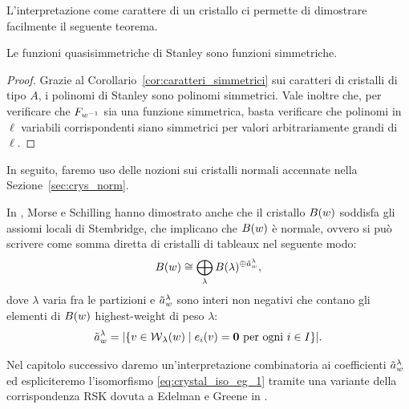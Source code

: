 L'interpretazione come carattere di un cristallo ci permette di dimostrare facilmente
il seguente teorema.

\begin{theorem}
    Le funzioni quasisimmetriche di Stanley sono funzioni simmetriche.
\end{theorem}

\begin{proof}
    Grazie al Corollario~\ref{cor:caratteri_simmetrici} sui caratteri di cristalli
    di tipo $A$, i polinomi di Stanley sono polinomi simmetrici.
    Vale inoltre che, per verificare che $F_{w^{-1}}$ sia una funzione
    simmetrica, basta verificare che polinomi in $\ell$ variabili corrispondenti
    siano simmetrici per valori arbitrariamente grandi di $\ell$.
\end{proof}

In seguito, faremo uso delle nozioni sui cristalli normali
accennate nella Sezione~\ref{sec:crys_norm}.

In \cite[Appendix~A]{morse-schilling-15}, Morse e Schilling hanno dimostrato anche che 
il cristallo $B(w)$ soddisfa gli assiomi locali di Stembridge, 
che implicano che $B(w)$ \`e normale, ovvero 
si pu\`o scrivere come somma diretta di cristalli di tableaux nel seguente
modo:
\begin{equation}
    \label{eq:crystal_iso_eg_1}
    B(w) \cong \bigoplus_{\lambda} B(\lambda)^{\oplus \tilde{a}_w^\lambda},
\end{equation}
dove $\lambda$ varia fra le partizioni e $\tilde{a}_w^\lambda$ sono interi non negativi
che contano gli elementi di $B(w)$ highest-weight di peso $\lambda$:
\[
    \tilde{a}_w^\lambda = \lvert \{ v \in \operatorname{\mathcal{W}}_\lambda(w) \mid
    e_i(v) = \mathbf{0} \text{ per ogni $i\in I$}\} \rvert.
\]

Nel capitolo successivo daremo un'interpretazione combinatoria ai coefficienti
$\tilde{a}_w^\lambda$ ed espliciteremo l'isomorfismo \eqref{eq:crystal_iso_eg_1}
tramite una variante della corrispondenza RSK dovuta a Edelman e Greene in 
\cite{edelman-greene-87}.



